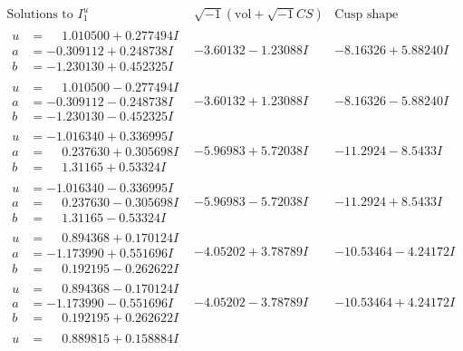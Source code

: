 \documentclass[1p]{elsarticle_modified}
\theoremstyle{definition}
\newcommand{\I}{\sqrt{-1}}
\begin{document}
$$\begin{array}{c|c|c}  
\text{Solutions to }I^u_{1}& \I (\text{vol} + \sqrt{-1}CS) & \text{Cusp shape}\\
 \hline 
\begin{aligned}
u &= \phantom{-}1.010500 + 0.277494 I \\
a &= -0.309112 + 0.248738 I \\
b &= -1.230130 + 0.452325 I\end{aligned}
 & -3.60132 - 1.23088 I & -8.16326 + 5.88240 I \\ \hline\begin{aligned}
u &= \phantom{-}1.010500 - 0.277494 I \\
a &= -0.309112 - 0.248738 I \\
b &= -1.230130 - 0.452325 I\end{aligned}
 & -3.60132 + 1.23088 I & -8.16326 - 5.88240 I \\ \hline\begin{aligned}
u &= -1.016340 + 0.336995 I \\
a &= \phantom{-}0.237630 + 0.305698 I \\
b &= \phantom{-}1.31165 + 0.53324 I\end{aligned}
 & -5.96983 + 5.72038 I & -11.2924 - 8.5433 I \\ \hline\begin{aligned}
u &= -1.016340 - 0.336995 I \\
a &= \phantom{-}0.237630 - 0.305698 I \\
b &= \phantom{-}1.31165 - 0.53324 I\end{aligned}
 & -5.96983 - 5.72038 I & -11.2924 + 8.5433 I \\ \hline\begin{aligned}
u &= \phantom{-}0.894368 + 0.170124 I \\
a &= -1.173990 + 0.551696 I \\
b &= \phantom{-}0.192195 - 0.262622 I\end{aligned}
 & -4.05202 + 3.78789 I & -10.53464 - 4.24172 I \\ \hline\begin{aligned}
u &= \phantom{-}0.894368 - 0.170124 I \\
a &= -1.173990 - 0.551696 I \\
b &= \phantom{-}0.192195 + 0.262622 I\end{aligned}
 & -4.05202 - 3.78789 I & -10.53464 + 4.24172 I \\ \hline\begin{aligned}
u &= \phantom{-}0.889815 + 0.158884 I \\

\end{aligned}
\end{array}$$
\end{document}
